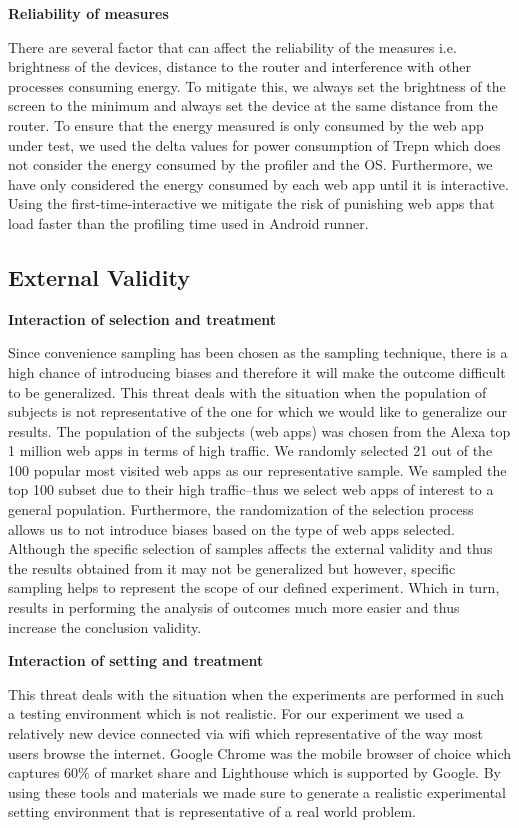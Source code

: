 \textbf{Reliability of measures}

There are several factor that can affect the reliability of the measures i.e. brightness of the devices, distance to the router and interference with other processes consuming energy. To mitigate this, we always set the brightness of the screen to the minimum and always set the device at the same distance from the router. To ensure that the energy measured is only consumed by the web app under test, we used the delta values for power consumption of Trepn which does not consider the energy consumed by the profiler and the OS. Furthermore, we have only considered the energy consumed by each web app until it is interactive. Using the first-time-interactive we mitigate the risk of punishing web apps that load faster than the profiling time used in Android runner.




\subsection{External Validity}

\textbf{Interaction of selection and treatment}

Since convenience sampling has been chosen as the sampling technique, there is a high chance of introducing biases and therefore it will make the outcome difficult to be generalized. This threat deals with the situation when the population of subjects is not representative of the one for which we would like to generalize our results. The population of the subjects (web apps) was chosen from the Alexa top 1 million web apps in terms of high traffic. We randomly selected 21 out of the 100 popular most visited web apps as our representative sample. We sampled the top 100 subset due to their high traffic--thus we select web apps of interest to a general population.  Furthermore, the randomization of the selection process allows us to not introduce biases based on the type of web apps selected.  
Although the specific selection of samples affects the external validity and thus the results obtained from it may not be generalized but however, specific sampling helps to represent the scope of our defined experiment. Which in turn, results in performing the analysis of outcomes much more easier and thus increase the conclusion validity. \newline


\textbf{Interaction of setting and treatment}

This threat deals with the situation when the experiments are performed in such a testing environment which is not realistic. For our experiment we used a relatively new device connected via wifi which representative of the way most users browse the internet. Google Chrome was the mobile browser of choice which captures 60\% of market share and Lighthouse which is supported by Google. By using these tools and materials we made sure to generate a realistic experimental setting environment that is representative of a real world problem.


